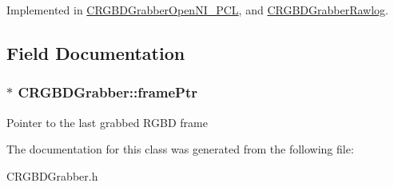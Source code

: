 Implemented in \hyperlink{class_c_r_g_b_d_grabber_open_n_i___p_c_l_a7ed8695258084e50b76241fe8543f527}{CRGBDGrabberOpenNI\_\-PCL}, and \hyperlink{class_c_r_g_b_d_grabber_rawlog_af499a26d2f6a92184fcc457e9c664da3}{CRGBDGrabberRawlog}.



\subsection{Field Documentation}
\hypertarget{class_c_r_g_b_d_grabber_a672772dade93a640a52e129f14c6d2fa}{
\subsubsection[{framePtr}]{$\ast$ {\bf CRGBDGrabber::framePtr}}}
\label{class_c_r_g_b_d_grabber_a672772dade93a640a52e129f14c6d2fa}
Pointer to the last grabbed RGBD frame 

The documentation for this class was generated from the following file:\begin{DoxyCompactItemize}
\item 
CRGBDGrabber.h\end{DoxyCompactItemize}
